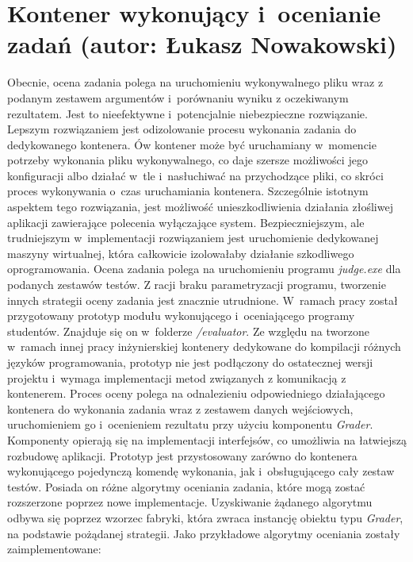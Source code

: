 \section{Kontener wykonujący i~ocenianie zadań (autor: Łukasz Nowakowski)}
Obecnie, ocena zadania polega na uruchomieniu wykonywalnego pliku wraz z podanym zestawem argumentów i~porównaniu wyniku z oczekiwanym rezultatem. Jest to nieefektywne i~potencjalnie niebezpieczne rozwiązanie. Lepszym rozwiązaniem jest odizolowanie procesu wykonania zadania do dedykowanego kontenera. Ów kontener może być uruchamiany w~momencie potrzeby wykonania pliku wykonywalnego, co daje szersze możliwości jego konfiguracji albo działać w~tle i~nasłuchiwać na przychodzące pliki, co skróci proces wykonywania o~czas uruchamiania kontenera. Szczególnie istotnym aspektem tego rozwiązania, jest możliwość unieszkodliwienia działania złośliwej aplikacji zawierające polecenia wyłączające system. Bezpieczniejszym, ale trudniejszym w~implementacji rozwiązaniem jest uruchomienie dedykowanej maszyny wirtualnej, która całkowicie izolowałaby działanie szkodliwego oprogramowania. 
\newline \indent Ocena zadania polega na uruchomieniu programu \textit{judge.exe} dla podanych zestawów testów. Z racji braku parametryzacji programu, tworzenie innych strategii oceny zadania jest znacznie utrudnione.
\newline \indent W~ramach pracy został przygotowany prototyp modułu wykonującego i~oceniającego programy studentów. Znajduje się on w~folderze \textit{/evaluator}. Ze względu na tworzone w~ramach innej pracy inżynierskiej kontenery dedykowane do kompilacji różnych języków programowania, prototyp nie jest podłączony do ostatecznej wersji projektu i~wymaga implementacji metod związanych z komunikacją z kontenerem. Proces oceny polega na odnalezieniu odpowiedniego działającego kontenera do wykonania zadania wraz z zestawem danych wejściowych, uruchomieniem go i~ocenieniem rezultatu przy użyciu komponentu \textit{Grader}. Komponenty opierają się na implementacji interfejsów, co umożliwia na łatwiejszą rozbudowę aplikacji. Prototyp jest przystosowany zarówno do kontenera wykonującego pojedynczą komendę wykonania, jak i~obsługującego cały zestaw testów. Posiada on różne algorytmy oceniania zadania, które mogą zostać rozszerzone poprzez nowe implementacje. Uzyskiwanie żądanego algorytmu odbywa się poprzez wzorzec fabryki, która zwraca instancję obiektu typu \textit{Grader}, na podstawie pożądanej strategii. Jako przykładowe algorytmy oceniania zostały zaimplementowane:
